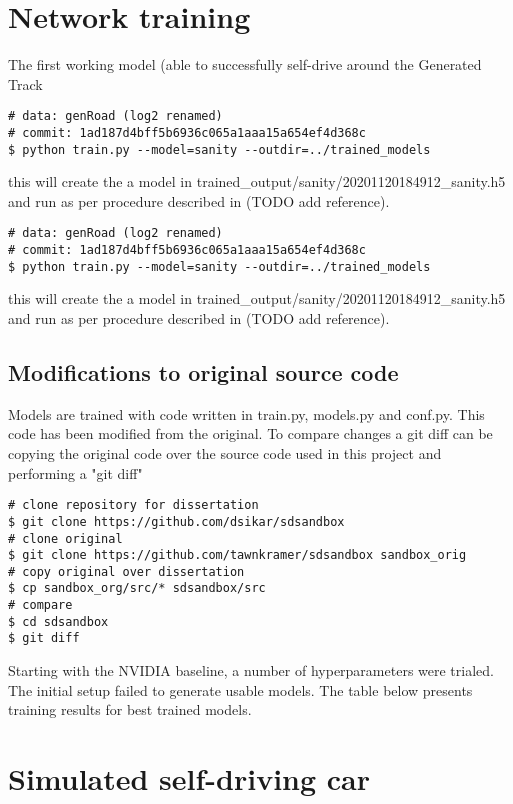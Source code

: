 \section{Network training}

The first working model (able to successfully self-drive around the Generated Track

\begin{verbatim}
# data: genRoad (log2 renamed)
# commit: 1ad187d4bff5b6936c065a1aaa15a654ef4d368c
$ python train.py --model=sanity --outdir=../trained_models
\end{verbatim}
this will create the a model in trained\_output/sanity/20201120184912\_sanity.h5
and run as per procedure described in (TODO add reference).



\begin{verbatim}
# data: genRoad (log2 renamed)
# commit: 1ad187d4bff5b6936c065a1aaa15a654ef4d368c
$ python train.py --model=sanity --outdir=../trained_models
\end{verbatim}
this will create the a model in trained\_output/sanity/20201120184912\_sanity.h5
and run as per procedure described in (TODO add reference).

\subsection{Modifications to original source code}
Models are trained with code written in train.py, models.py and conf.py. This code has been modified from the original. To compare changes a git diff can be copying the original code over the source code used in this project and performing a "git diff"
\begin{verbatim}
# clone repository for dissertation
$ git clone https://github.com/dsikar/sdsandbox
# clone original
$ git clone https://github.com/tawnkramer/sdsandbox sandbox_orig
# copy original over dissertation
$ cp sandbox_org/src/* sdsandbox/src
# compare
$ cd sdsandbox 
$ git diff
\end{verbatim}


Starting with the NVIDIA baseline, a number of hyperparameters were trialed. The initial setup failed to generate usable models. 
The table below presents training results for best trained models.


\section{Simulated self-driving car}

